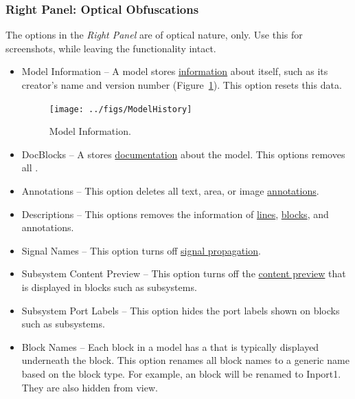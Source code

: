 \documentclass{article}
\begin{document}
\subsubsection{Right Panel: Optical Obfuscations}
\label{lbl:rightside}
The options in the \emph{Right Panel} are of optical nature, only. Use this for screenshots, while leaving the functionality intact.

\begin{itemize}
	\item Model Information -- A \Simulink model stores \href{https://www.mathworks.com/help/simulink/ug/managing-model-versions.html}{information} about itself, such as its creator's name and version number (Figure~\ref{fig:model_history}). This option resets this data.
\begin{figure}[htb]
	\centering
	\texttt{[image: ../figs/ModelHistory]}
	\caption{Model Information.}
	\label{fig:model_history}
\end{figure}
	
	\item DocBlocks -- A \docblock stores \href{https://www.mathworks.com/help/simulink/slref/docblock.html}{documentation} about the model. This options removes all .
	
	\item Annotations -- This option deletes all text, area, or image \href{https://www.mathworks.com/help/simulink/ug/annotations.html}{annotations}.

	\item Descriptions -- This options removes the  information of \href{https://www.mathworks.com/help/simulink/ug/signal-basics.html#bs9gzwp}{lines}, \href{https://www.mathworks.com/help/simulink/ug/block-properties-dialog-box.html}{blocks}, and annotations. 

	\item Signal Names -- This option turns off \href{https://www.mathworks.com/help/simulink/ug/signal-label-propagation.html}{signal propagation}.

    \item Subsystem Content Preview -- This option turns off the \href{https://www.mathworks.com/help/simulink/ug/preview-content-of-hierarchical-items.html}{content preview} that is displayed in blocks such as subsystems.
	
	\item Subsystem Port Labels -- This option hides the port labels shown on blocks such as subsystems.
	
	\item Block Names -- Each block in a model has a  that is typically displayed underneath the block. This option renames all block names to a generic name based on the block type. For example, an \inport block will be renamed to Inport1. They are also hidden from view.


\end{itemize}
\end{document}
